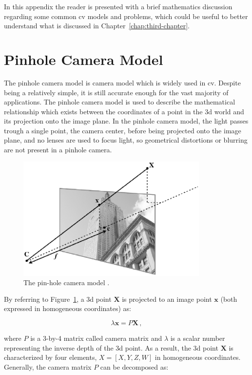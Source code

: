 In this appendix the reader is presented with a brief mathematics discussion regarding some common \acrshort{cv} models and problems, which could be useful to better understand what is discussed in Chapter~\ref{chap:third-chapter}.

\section{Pinhole Camera Model}\label{subsection:pinhole}
The pinhole camera model is camera model which is widely used in \acrshort{cv}. Despite being a relatively simple, it is still accurate enough for the vast majority of applications. The pinhole camera model is used to describe the mathematical relationship which exists between the coordinates of a point in the \acrshort{3d} world and its projection onto the image plane. In the pinhole camera model, the light passes trough a single point, the camera center, before being projected onto the image plane, and no lenses are used to focus light, so geometrical distortions or blurring are not present in a pinhole camera.

\begin{figure}[htbp]
  \centering
  \includegraphics[width=0.85\textwidth]{gfx/pinholeCamera.eps}
  \caption{The pin-hole camera model \cite{solem2012programming}.}
  \label{fig:pinholeCamera}
\end{figure}

By referring to Figure~\ref{fig:pinholeCamera}, a \acrshort{3d} point $\mathbf{X}$ is projected to an image point $\mathbf{x}$ (both expressed in homogeneous coordinates) as:

\begin{equation*}
  \lambda\mathbf{x}=P\mathbf{X} \,,
\end{equation*}

where $P$ is a 3-by-4 matrix called camera matrix and $\lambda$ is a scalar number representing the inverse depth of the \acrshort{3d} point. As a result, the \acrshort{3d} point $\mathbf{X}$ is characterized by four elements, $X = [X, Y , Z, W ]$ in homogeneous coordinates.
Generally, the camera matrix $P$ can be decomposed as:

